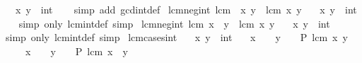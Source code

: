 \begin{isabellebody}
\ \ \ x\ y\ {\isacharcolon}{\kern0pt}{\isacharcolon}{\kern0pt}\ int\isanewline
%
\isadelimproof
\ \ %
\endisadelimproof
%
\isatagproof
{}\isamarkupfalse%
\ {\isacharparenleft}{\kern0pt}simp\ add{\isacharcolon}{\kern0pt}\ gcd{\isacharunderscore}{\kern0pt}int{\isacharunderscore}{\kern0pt}def{\isacharparenright}{\kern0pt}%
\endisatagproof
{\isafoldproof}%
%
\isadelimproof
\isanewline
%
\endisadelimproof
\isanewline
{}\isamarkupfalse%
\ lcm{\isacharunderscore}{\kern0pt}neg{}{\isacharunderscore}{\kern0pt}int{\isacharcolon}{\kern0pt}\ {\isachardoublequoteopen}lcm\ {\isacharparenleft}{\kern0pt}{\isacharminus}{\kern0pt}\ x{\isacharparenright}{\kern0pt}\ y\ {\isacharequal}{\kern0pt}\ lcm\ x\ y{\isachardoublequoteclose}\isanewline
\ \ \ x\ y\ {\isacharcolon}{\kern0pt}{\isacharcolon}{\kern0pt}\ int\isanewline
%
\isadelimproof
\ \ %
\endisadelimproof
%
\isatagproof
{}\isamarkupfalse%
\ {\isacharparenleft}{\kern0pt}simp\ only{\isacharcolon}{\kern0pt}\ lcm{\isacharunderscore}{\kern0pt}int{\isacharunderscore}{\kern0pt}def{\isacharparenright}{\kern0pt}\ simp%
\endisatagproof
{\isafoldproof}%
%
\isadelimproof
\isanewline
%
\endisadelimproof
\isanewline
{}\isamarkupfalse%
\ lcm{\isacharunderscore}{\kern0pt}neg{}{\isacharunderscore}{\kern0pt}int{\isacharcolon}{\kern0pt}\ {\isachardoublequoteopen}lcm\ x\ {\isacharparenleft}{\kern0pt}{\isacharminus}{\kern0pt}\ y{\isacharparenright}{\kern0pt}\ {\isacharequal}{\kern0pt}\ lcm\ x\ y{\isachardoublequoteclose}\isanewline
\ \ \ x\ y\ {\isacharcolon}{\kern0pt}{\isacharcolon}{\kern0pt}\ int\isanewline
%
\isadelimproof
\ \ %
\endisadelimproof
%
\isatagproof
{}\isamarkupfalse%
\ {\isacharparenleft}{\kern0pt}simp\ only{\isacharcolon}{\kern0pt}\ lcm{\isacharunderscore}{\kern0pt}int{\isacharunderscore}{\kern0pt}def{\isacharparenright}{\kern0pt}\ simp%
\endisatagproof
{\isafoldproof}%
%
\isadelimproof
\isanewline
%
\endisadelimproof
\isanewline
{}\isamarkupfalse%
\ lcm{\isacharunderscore}{\kern0pt}cases{\isacharunderscore}{\kern0pt}int{\isacharcolon}{\kern0pt}\isanewline
\ \ \ x\ y\ {\isacharcolon}{\kern0pt}{\isacharcolon}{\kern0pt}\ int\isanewline
\ \ \ {\isachardoublequoteopen}x\ {\isasymge}\ {}\ {\isasymLongrightarrow}\ y\ {\isasymge}\ {}\ {\isasymLongrightarrow}\ P\ {\isacharparenleft}{\kern0pt}lcm\ x\ y{\isacharparenright}{\kern0pt}{\isachardoublequoteclose}\isanewline
\ \ \ \ \ {\isachardoublequoteopen}x\ {\isasymge}\ {}\ {\isasymLongrightarrow}\ y\ {\isasymle}\ {}\ {\isasymLongrightarrow}\ P\ {\isacharparenleft}{\kern0pt}lcm\ x\ {\isacharparenleft}{\kern0pt}{\isacharminus}{\kern0pt}\ y{\isacharparenright}{\kern0pt}{\isacharparenright}{\kern0pt}{\isachardoublequoteclose}\isanewline

\end{isabellebody}
